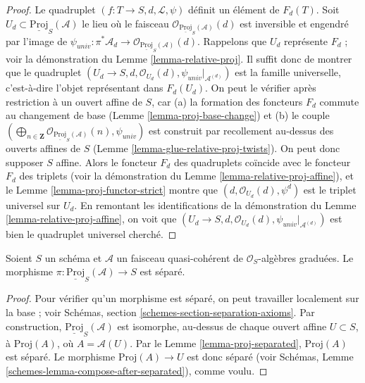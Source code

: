 \begin{proof}
Le quadruplet $(f : T \to S, d, \mathcal{L}, \psi)$ définit un élément de
$F_d(T)$. Soit
$U_d \subset \underline{\text{Proj}}_S(\mathcal{A})$ le lieu
où le faisceau
$\mathcal{O}_{\underline{\text{Proj}}_S(\mathcal{A})}(d)$ est
inversible et engendré par l'image de
$\psi_{univ} : \pi^*\mathcal{A}_d \to
\mathcal{O}_{\underline{\text{Proj}}_S(\mathcal{A})}(d)$.
Rappelons que $U_d$ représente $F_d$ ; voir la démonstration du
Lemme \ref{lemma-relative-proj}. Il
suffit donc de montrer que le quadruplet
$(U_d \to S, d, \mathcal{O}_{U_d}(d), \psi_{univ}|_{\mathcal{A}^{(d)}})$
est la famille universelle, c'est-à-dire l'objet représentant dans
$F_d(U_d)$. On peut le vérifier après restriction à un ouvert affine de
$S$, car (a) la formation des foncteurs
$F_d$ commute au changement de base
(Lemme \ref{lemma-proj-base-change}) et (b) le couple
$(\bigoplus_{n \in \mathbf{Z}}
\mathcal{O}_{\underline{\text{Proj}}_S(\mathcal{A})}(n),
\psi_{univ})$
est construit par recollement au-dessus des ouverts affines de $S$
(Lemme \ref{lemma-glue-relative-proj-twists}).
On peut donc supposer $S$ affine. Alors le foncteur $F_d$ des quadruplets
coïncide avec le foncteur $F_d$ des triplets (voir la démonstration du
Lemme \ref{lemma-relative-proj-affine}), et le
Lemme \ref{lemma-proj-functor-strict} montre que
$(d, \mathcal{O}_{U_d}(d), \psi^d)$ est le triplet universel sur $U_d$.
En remontant les identifications de la démonstration du
Lemme \ref{lemma-relative-proj-affine}, on voit que
$(U_d \to S, d, \mathcal{O}_{U_d}(d), \psi_{univ}|_{\mathcal{A}^{(d)}})$
est bien le quadruplet universel cherché.
\end{proof}

\begin{lemma}
\label{lemma-relative-proj-separated}
Soient $S$ un schéma et $\mathcal{A}$
un faisceau quasi-cohérent de
$\mathcal{O}_S$-algèbres graduées. Le morphisme
$\pi : \underline{\text{Proj}}_S(\mathcal{A}) \to S$ est séparé.
\end{lemma}

\begin{proof}
Pour vérifier qu'un morphisme est séparé, on peut travailler localement sur
la base ; voir Schémas, section \ref{schemes-section-separation-axioms}.
Par construction, $\underline{\text{Proj}}_S(\mathcal{A})$ est isomorphe,
au-dessus de chaque ouvert affine $U \subset S$, à $\text{Proj}(A)$, où
$A = \mathcal{A}(U)$. Par le Lemme \ref{lemma-proj-separated},
$\text{Proj}(A)$ est séparé. Le morphisme $\text{Proj}(A) \to U$ est donc
séparé (voir Schémas, Lemme \ref{schemes-lemma-compose-after-separated}),
comme voulu.
\end{proof}

